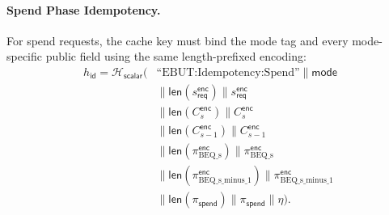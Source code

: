 \documentclass[11pt]{article}
\theoremstyle{definitionstyle}
\theoremstyle{plain}
\begin{document}
\paragraph{Spend Phase Idempotency.}
For spend requests, the cache key must bind the mode tag and every mode-specific public field using the same length-prefixed encoding:
\[
\begin{aligned}
h_{\mathsf{id}} = \mathcal{H}_{\mathsf{scalar}}\!\bigl(&\text{``EBUT:Idempotency:Spend''} \parallel \mathsf{mode} \\
&\parallel \mathsf{len}(s_{\mathsf{req}}^{\mathsf{enc}}) \parallel s_{\mathsf{req}}^{\mathsf{enc}} \\
&\parallel \mathsf{len}(C_s^{\mathsf{enc}}) \parallel C_s^{\mathsf{enc}} \\
&\parallel \mathsf{len}(C_{s-1}^{\mathsf{enc}}) \parallel C_{s-1}^{\mathsf{enc}} \\
&\parallel \mathsf{len}(\pi_{\text{BEQ\_s}}^{\mathsf{enc}}) \parallel \pi_{\text{BEQ\_s}}^{\mathsf{enc}} \\
&\parallel \mathsf{len}(\pi_{\text{BEQ\_s\_minus\_1}}^{\mathsf{enc}}) \parallel \pi_{\text{BEQ\_s\_minus\_1}}^{\mathsf{enc}} \\
&\parallel \mathsf{len}(\pi_{\mathsf{spend}}) \parallel \pi_{\mathsf{spend}} \parallel \eta \bigr).
\end{aligned}
\]
\end{document}

